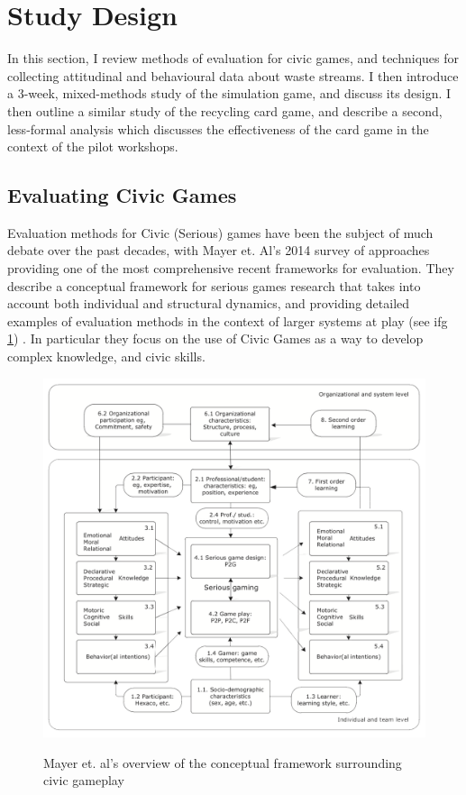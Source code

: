 \documentclass[nofonts,nols,justified,nobib]{tufte-book}
\begin{document}
\section*{Study Design}

In this section, I review methods of evaluation for civic games, and techniques for collecting attitudinal and behavioural data about waste streams. I then introduce a 3-week, mixed-methods study of the simulation game, and discuss its design. I then outline a similar study of the recycling card game, and describe a second, less-formal analysis which discusses the effectiveness of the card game in the context of the pilot workshops. %

\subsection*{Evaluating Civic Games}

Evaluation methods for Civic (Serious) games have been the subject of much debate over the past decades, with Mayer et. Al's 2014 survey of approaches providing one of the most comprehensive recent frameworks for evaluation. They describe a conceptual framework for serious games research that takes into account both individual and structural dynamics, and providing detailed examples of evaluation methods in the context of larger systems at play (see ifg \ref{mayer}) \cite{mayer_research_2014}. In particular they focus on the use of Civic Games as a way to develop complex knowledge, and civic skills.

\begin{figure}
  \caption{Mayer et. al's overview of the conceptual framework surrounding civic gameplay \cite{mayer_research_2014}}
  \includegraphics[width=1\linewidth]{img/4/mayer-diagram.png}
  \label{mayer}
\end{figure}
\end{document}
